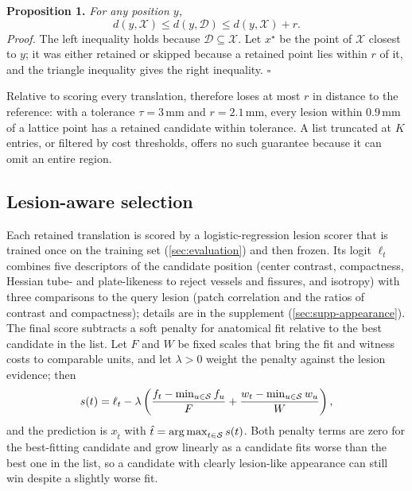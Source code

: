 \noindent\textbf{Proposition 1.} \emph{For any position $y$,}
\begin{equation}
d(y, \mathcal{X}) \le d(y, \mathcal{D}) \le d(y, \mathcal{X}) + r .
\label{eq:coverage}
\end{equation}
\noindent\emph{Proof.}
The left inequality holds because $\mathcal{D} \subseteq \mathcal{X}$.
Let $x^\star$ be the point of $\mathcal{X}$ closest to $y$; it was either retained or skipped because a retained point lies within $r$ of it, and the triangle inequality gives the right inequality. \hfill$\square$

\noindent Relative to scoring every translation, \ours therefore loses at most $r$ in distance to the reference: with a tolerance $\tau = 3$\,mm and $r = 2.1$\,mm, every lesion within $0.9$\,mm of a lattice point has a retained candidate within tolerance.
A list truncated at $K$ entries, or filtered by cost thresholds, offers no such guarantee because it can omit an entire region.

\subsection{Lesion-aware selection}
\label{sec:scorer-def}
Each retained translation is scored by a logistic-regression lesion scorer that is trained once on the training set (\cref{sec:evaluation}) and then frozen.
Its logit $\ell_t$ combines five descriptors of the candidate position (center contrast, compactness, Hessian tube- and plate-likeness to reject vessels and fissures, and isotropy) with three comparisons to the query lesion (patch correlation and the ratios of contrast and compactness); details are in the supplement (\cref{sec:supp-appearance}).
The final score subtracts a soft penalty for anatomical fit relative to the best candidate in the list.
Let $F$ and $W$ be fixed scales that bring the fit and witness costs to comparable units, and let $\lambda > 0$ weight the penalty against the lesion evidence; then
\begin{equation}
s(t) = \ell_t - \lambda\left(\frac{f_t - \min_{u\in\mathcal{S}} f_u}{F} + \frac{w_t - \min_{u\in\mathcal{S}} w_u}{W}\right),
\label{eq:direct}
\end{equation}
and the prediction is $x_{\hat t}$ with $\hat t = \operatorname*{arg\,max}_{t\in\mathcal{S}} s(t)$.
Both penalty terms are zero for the best-fitting candidate and grow linearly as a candidate fits worse than the best one in the list, so a candidate with clearly lesion-like appearance can still win despite a slightly worse fit.

